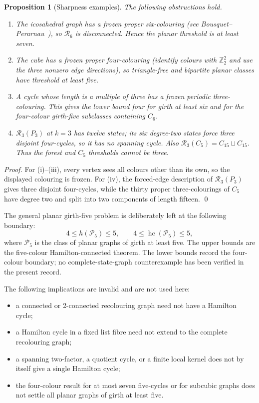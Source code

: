 \documentclass[11pt]{article}
\newtheorem{proposition}[theorem]{Proposition}
\theoremstyle{remark}
\newcommand{\R}{\mathcal R}
\newcommand{\hc}{\operatorname{hc}}
\numberwithin{equation}{section}
\begin{document}
\begin{proposition}[Sharpness examples]
\label{prop:sharpness}
The following obstructions hold.
\begin{enumerate}[label=(\roman*)]
\item The icosahedral graph has a frozen proper six-colouring (see Bousquet--Perarnau~\cite{BP16}), so $\R_6$ is disconnected.  Hence the planar threshold is at least seven.
\item The cube has a frozen proper four-colouring (identify colours with $\mathbb Z_2^2$ and use the three nonzero edge directions), so triangle-free and bipartite planar classes have threshold at least five.
\item A cycle whose length is a multiple of three has a frozen periodic three-colouring.  This gives the lower bound four for girth at least six and for the four-colour girth-five subclasses containing $C_6$.
\item $\R_3(P_3)$ at $k=3$ has twelve states; its six degree-two states force three disjoint four-cycles, so it has no spanning cycle.  Also $\R_3(C_5)=C_{15}\sqcup C_{15}$.  Thus the forest and $C_5$ thresholds cannot be three.
\end{enumerate}
\end{proposition}

\begin{proof}
For (i)--(iii), every vertex sees all colours other than its own, so the displayed colouring is frozen.  For (iv), the forced-edge description of $\R_3(P_3)$ gives three disjoint four-cycles, while the thirty proper three-colourings of $C_5$ have degree two and split into two components of length fifteen. \qed
\end{proof}

The general planar girth-five problem is deliberately left at the following boundary:
\[
 4\le h(\mathcal P_5)\le5,\qquad
 4\le\hc(\mathcal P_5)\le5,
\]
where $\mathcal P_5$ is the class of planar graphs of girth at least five.  The upper bounds are the five-colour Hamilton-connected theorem.  The lower bounds record the four-colour boundary; no complete-state-graph counterexample has been verified in the present record.

The following implications are invalid and are not used here:
\begin{itemize}
\item a connected or 2-connected recolouring graph need not have a Hamilton cycle;
\item a Hamilton cycle in a fixed list fibre need not extend to the complete recolouring graph;
\item a spanning two-factor, a quotient cycle, or a finite local kernel does not by itself give a single Hamilton cycle;
\item the four-colour result for at most seven five-cycles or for subcubic graphs does not settle all planar graphs of girth at least five.
\end{itemize}
\end{document}

